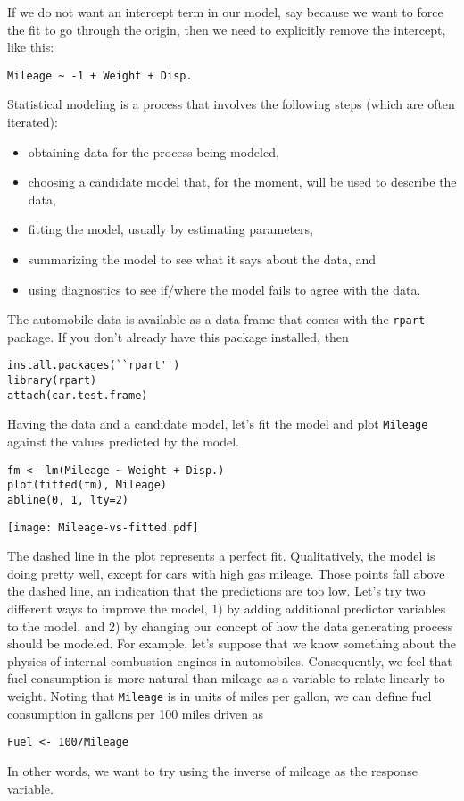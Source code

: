 If we do not want an intercept term in our model, say because we want to
force the fit to go through the origin, then we need to explicitly remove
the intercept, like this:
\begin{Verbatim}
Mileage ~ -1 + Weight + Disp.
\end{Verbatim}
Statistical modeling is a process that involves the following steps (which are often
iterated):
\begin{itemize}
\item obtaining data for the process being modeled,
\item choosing a candidate model that, for the moment, will be used
  to describe the data,
\item fitting the model, usually by estimating parameters,
\item summarizing the model to see what it says about the data, and
\item using diagnostics to see if/where the model fails to agree
  with the data.
\end{itemize}
The automobile data is available as a data frame that comes with
the \texttt{rpart} package. 
If you don't already have this package installed, then
\begin{Verbatim}
install.packages(``rpart'')
library(rpart)
attach(car.test.frame)
\end{Verbatim}
Having the data and a candidate model, let's fit the model
and plot \texttt{Mileage} against the values predicted by the model.
\begin{Verbatim}[samepage=true]
fm <- lm(Mileage ~ Weight + Disp.)
plot(fitted(fm), Mileage)
abline(0, 1, lty=2)
\end{Verbatim}
\texttt{[image: Mileage-vs-fitted.pdf]}

The dashed line in the plot represents a perfect fit. Qualitatively,
the model is doing pretty well, except for cars with high gas mileage.
Those points fall above the dashed line, an indication that the
predictions are too low. Let's try two different ways to improve the model,
1) by adding additional predictor variables to the model, and 2)
by changing our concept of how the data generating process should
be modeled. For example, let's suppose that we know something about
the physics of internal combustion engines in automobiles. Consequently,
we feel that fuel consumption is more natural than mileage as a
variable to relate linearly to weight. Noting that \texttt{Mileage}
is in units of miles per gallon, we can define fuel consumption in gallons per
100 miles driven as
\begin{Verbatim}
Fuel <- 100/Mileage
\end{Verbatim}
In other words, we want to try using the inverse of mileage as the
response variable.

